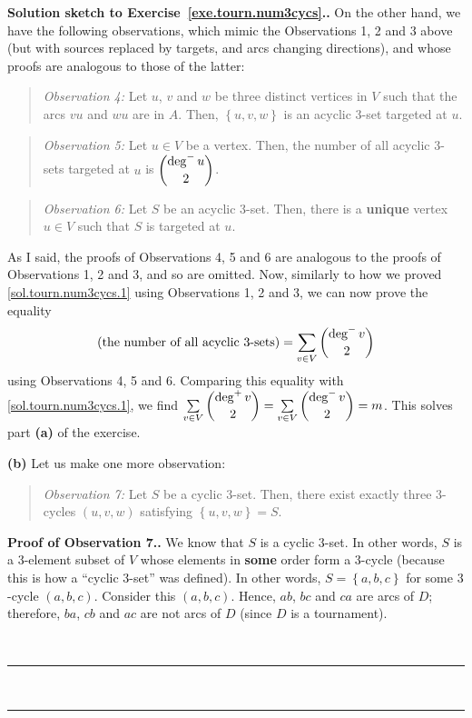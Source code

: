 \documentclass[numbers=enddot,12pt,final,onecolumn,notitlepage]{scrartcl}%
\newcounter{exer}
\theoremstyle{definition}
\newenvironment{statement}{\begin{quote}}{\end{quote}}
\newenvironment{proof}[1][Proof]{\noindent\textbf{#1.} }{\ \rule{0.5em}{0.5em}}
\let\sumnonlimits\sum
\renewcommand{\sum}{\sumnonlimits\limits}
\newcommand{\set}[1]{\left\{ #1 \right\}}
\newcommand{\tup}[1]{\left( #1 \right)}
\begin{document}
\begin{proof}[Solution sketch to Exercise~\ref{exe.tourn.num3cycs}.]
On the other hand, we have the following observations, which mimic
the Observations 1, 2 and 3 above (but with sources replaced by
targets, and arcs changing directions), and whose proofs are
analogous to those of the latter:

\begin{statement}
\textit{Observation 4:} Let $u$, $v$ and $w$ be three distinct
vertices in $V$ such that the arcs $vu$ and $wu$ are in $A$.
Then, $\set{u, v, w}$ is an acyclic 3-set targeted at $u$.
\end{statement}

\begin{statement}
\textit{Observation 5:} Let $u \in V$ be a vertex. Then, the number
of all acyclic 3-sets targeted at $u$ is $\dbinom{\deg^- u}{2}$.
\end{statement}

\begin{statement}
\textit{Observation 6:} Let $S$ be an acyclic 3-set. Then, there is
a \textbf{unique} vertex $u \in V$ such that $S$ is targeted at $u$.
\end{statement}

As I said, the proofs of Observations 4, 5 and 6 are analogous to the
proofs of Observations 1, 2 and 3, and so are omitted. Now, similarly
to how we proved \eqref{sol.tourn.num3cycs.1} using Observations 1, 2
and 3, we can now prove the equality
\begin{equation}
\tup{\text{the number of all acyclic 3-sets}}
= \sum_{v \in V} \dbinom{\deg^- v}{2}
\label{sol.tourn.num3cycs.2}
\end{equation}
using Observations 4, 5 and 6. Comparing this equality with
\eqref{sol.tourn.num3cycs.1}, we find \newline
$ \sum_{v \in V} \dbinom{\deg^+ v}{2}
= \sum_{v \in V} \dbinom{\deg^- v}{2} = m$. This solves part
\textbf{(a)} of the exercise.

\textbf{(b)} Let us make one more observation:

\begin{statement}
\textit{Observation 7:} Let $S$ be a cyclic 3-set. Then, there exist
exactly three $3$-cycles $\tup{u, v, w}$ satisfying
$\set{u, v, w} = S$.
\end{statement}
\begin{proof}[Proof of Observation 7.]
We know that $S$ is a cyclic 3-set. In other words, $S$ is a
$3$-element subset of $V$ whose elements in \textbf{some} order form a
$3$-cycle (because this is how a ``cyclic 3-set'' was defined). In
other words, $S = \set{a, b, c}$ for some $3$-cycle $\tup{a, b, c}$.
Consider this $\tup{a, b, c}$. Hence, $ab$, $bc$ and $ca$ are arcs of
$D$; therefore, $ba$, $cb$ and $ac$ are not arcs of $D$ (since $D$ is
a tournament).


\end{proof}
\end{proof}
\end{document}
